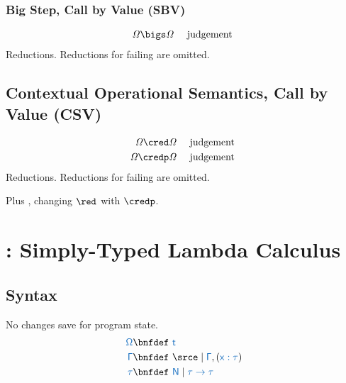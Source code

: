 \documentclass{article}
\begin{document}
\subsubsection{Big Step, Call by Value (SBV)}
\begin{align*}
	\com{\Omega\bigs\Omega} 
	&&
	\text{ judgement }
\end{align*}
Reductions.
Reductions for failing are omitted.
\begin{center}
\end{center}

\subsection{Contextual Operational Semantics, Call by Value (CSV)}
\begin{align*}
	\com{\Omega\cred\Omega} 
	&&
	\text{ judgement }
	\\
	\com{\Omega\credp\Omega} 
	&&
	\text{ judgement }
\end{align*}
Reductions.
Reductions for failing are omitted.
\begin{center}
\end{center}
Plus , changing $\red$ with $\credp$. 

\section{\stlc: Simply-Typed Lambda Calculus}
\subsection{Syntax}
No changes save for program state.
\begin{align*}
	\src{\Omega} \bnfdef&\
		\src{t}
	\\
	\src{\Gamma} \bnfdef&\
		\srce \mid \src{\Gamma},(\src{x:\tau})
	\\
	\src{\tau} \bnfdef&\
		\src{N} \mid \src{\tau\to\tau}
\end{align*}
\end{document}
